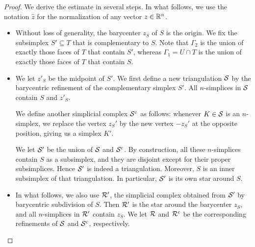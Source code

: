 \documentclass[10pt,letterpaper]{article}
\begin{document}
\begin{proof}
    We derive the estimate in several steps. 
    In what follows, we use the notation $\hat z$ for the normalization of any vector $z \in {\mathbb R}^{n}$.
    \begin{itemize}
        \item 
        Without loss of generality, the barycenter $z_{S}$ of $S$ is the origin. 
        We fix the subsimplex $S' \subseteq T$ that is complementary to $S$.
        Note that ${\Gamma_2}$ is the union of exactly those faces of $T$ that contain $S'$,
        whereas ${\Gamma_1} = U \cap T$ is the union of exactly those faces of $T$ that contain $S$. 
        
        
        \item 
        We let $z'_{S}$ be the midpoint of $S'$. 
        We first define a new triangulation ${\mathcal S}$ by the barycentric refinement of the complementary simplex $S'$. 
        All $n$-simplices in ${\mathcal S}$ contain $S$ and $z'_{S}$.
        
        We define another simplicial complex ${\mathcal S}^c$ as follows:
        whenever $K \in {\mathcal S}$ is an $n$-simplex, 
        we replace the vertex $z_{S}'$ by the new vertex $-z_{S}'$ at the opposite position,
        giving us a simplex $K'$. 
        
        We let ${\mathcal S}'$ be the union of ${\mathcal S}$ and ${\mathcal S}^c$. 
        By construction, all these $n$-simplices contain $S$ as a subsimplex,
        and they are disjoint except for their proper subsimplices. 
        Hence ${\mathcal S}'$ is indeed a triangulation. 
        Moreover, $S$ is an inner subsimplex of that triangulation. 
        In particular, ${\mathcal S}'$ is its own star around $S$.
        
        
        \item 
        In what follows, we also use ${\mathcal R}'$, 
        the simplicial complex obtained from ${\mathcal S}'$ by barycentric subdivision of $S$.
        Then ${\mathcal R}'$ is the star around the barycenter $z_S$,
        and all $n$-simplices in ${\mathcal R}'$ contain $z_{S}$. 
        We let ${\mathcal R}$ and ${\mathcal R}^{c}$ be the corresponding refinements of ${\mathcal S}$ and ${\mathcal S}^{c}$, respectively.
        

\end{itemize}
\end{proof}
\end{document}
